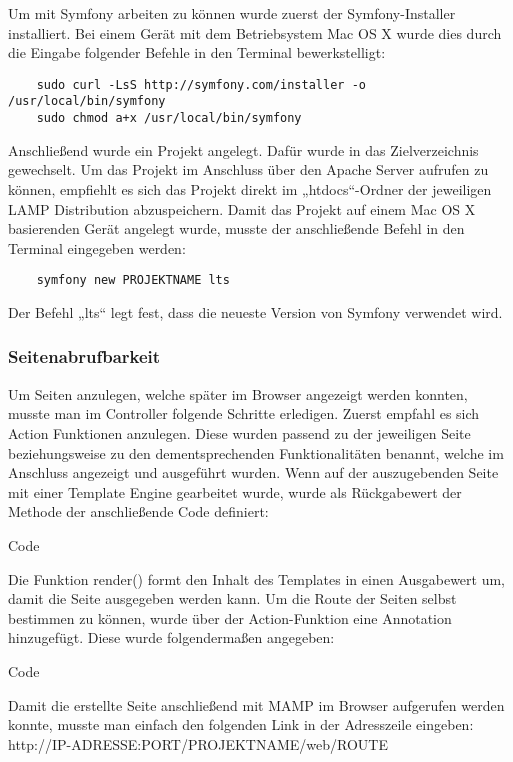 	Um mit Symfony arbeiten zu können wurde zuerst der Symfony-Installer installiert. Bei einem Gerät mit dem Betriebsystem Mac OS X wurde dies durch die Eingabe folgender Befehle in den Terminal bewerkstelligt:
	\lstset{language = bash}
  	\begin{lstlisting}
	sudo curl -LsS http://symfony.com/installer -o /usr/local/bin/symfony
	sudo chmod a+x /usr/local/bin/symfony
  	\end{lstlisting}

	Anschließend wurde ein Projekt angelegt. Dafür wurde in das Zielverzeichnis gewechselt. Um das Projekt im Anschluss über den Apache Server aufrufen zu können, empfiehlt es sich das Projekt direkt im „htdocs“-Ordner der jeweiligen LAMP Distribution abzuspeichern. Damit das Projekt auf einem Mac OS X basierenden Gerät angelegt wurde, musste der anschließende Befehl in den Terminal eingegeben werden:
	\lstset{language = bash}
  	\begin{lstlisting}
	symfony new PROJEKTNAME lts
  	\end{lstlisting}
	Der Befehl „lts“ legt fest, dass die neueste Version von Symfony verwendet wird.

    \subsubsection{Seitenabrufbarkeit}

	Um Seiten anzulegen, welche später im Browser angezeigt werden konnten, musste man im Controller folgende Schritte erledigen. Zuerst empfahl es sich Action Funktionen anzulegen. Diese wurden passend zu der jeweiligen Seite beziehungsweise zu den dementsprechenden Funktionalitäten benannt, welche im Anschluss angezeigt und ausgeführt wurden. Wenn auf der auszugebenden Seite mit einer Template Engine gearbeitet wurde, wurde als Rückgabewert der Methode der anschließende Code definiert:
	
	Code
	
	Die Funktion render() formt den Inhalt des Templates in einen Ausgabewert um, damit die Seite  ausgegeben werden kann.
	Um die Route der Seiten selbst bestimmen zu können, wurde über der Action-Funktion eine Annotation hinzugefügt. Diese wurde folgendermaßen angegeben:
	
	Code
	
	Damit die erstellte Seite anschließend mit MAMP im Browser aufgerufen werden konnte, musste man einfach den folgenden Link in der Adresszeile eingeben:
	http://IP-ADRESSE:PORT/PROJEKTNAME/web/ROUTE

